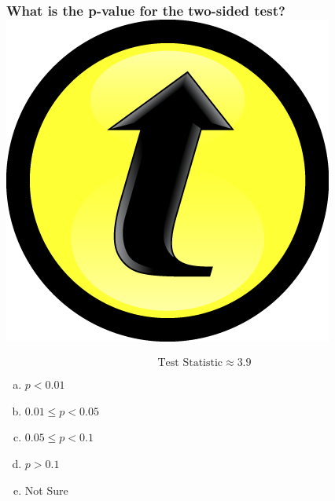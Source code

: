 \documentclass[handout]{beamer}
\begin{document}
\begin{frame}[c]\frametitle{What is the p-value for the two-sided test?  \hfill \includegraphics[scale = 0.05]{./images/clicker}}
    
$$\boxed{\mbox{Test Statistic} \approx 3.9}$$

\begin{enumerate}[(a)]
	\item $p < 0.01$
	\item $0.01 \leq p < 0.05$
	\item $0.05 \leq p < 0.1$
	\item $p > 0.1$
	\item Not Sure
\end{enumerate}
\end{frame}
\end{document}
